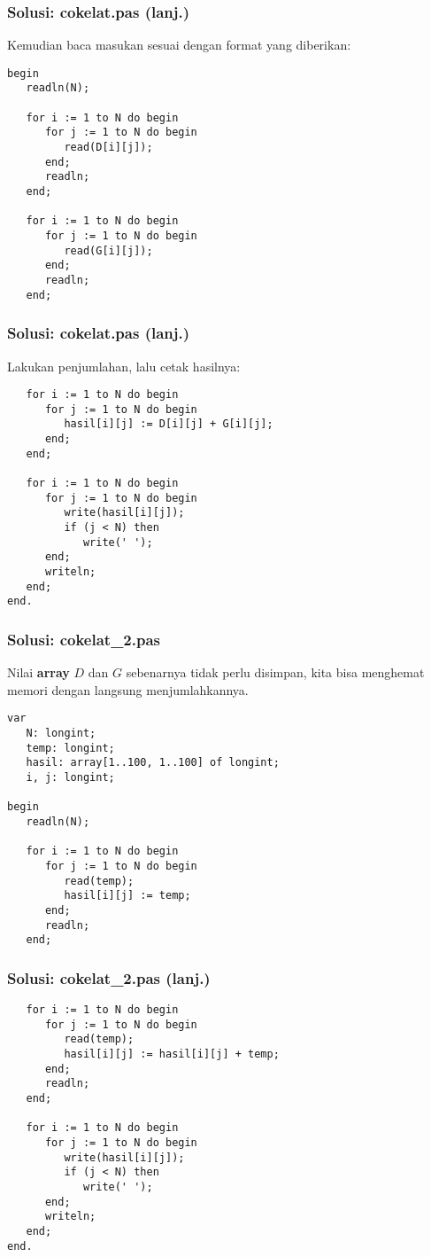 \documentclass{beamer}
\begin{document}
\begin{frame}[fragile]
\frametitle{Solusi: cokelat.pas (lanj.)}
Kemudian baca masukan sesuai dengan format yang diberikan:
\begin{lstlisting}
begin
   readln(N);
   
   for i := 1 to N do begin
      for j := 1 to N do begin
         read(D[i][j]);
      end;
      readln;
   end;

   for i := 1 to N do begin
      for j := 1 to N do begin
         read(G[i][j]);
      end;
      readln;
   end;
\end{lstlisting}
\end{frame}

\begin{frame}[fragile]
\frametitle{Solusi: cokelat.pas (lanj.)}
Lakukan penjumlahan, lalu cetak hasilnya:
\begin{lstlisting}
   for i := 1 to N do begin
      for j := 1 to N do begin
         hasil[i][j] := D[i][j] + G[i][j];
      end;
   end;   

   for i := 1 to N do begin
      for j := 1 to N do begin
         write(hasil[i][j]);
         if (j < N) then 
            write(' ');
      end;
      writeln;
   end;
end.
\end{lstlisting}
\end{frame}

\begin{frame}[fragile]
\frametitle{Solusi: cokelat\_2.pas}
Nilai \textbf{array} $D$ dan $G$ sebenarnya tidak perlu disimpan, kita bisa menghemat memori dengan langsung menjumlahkannya. 
\begin{lstlisting}
var
   N: longint;
   temp: longint;
   hasil: array[1..100, 1..100] of longint;
   i, j: longint;

begin
   readln(N);
   
   for i := 1 to N do begin
      for j := 1 to N do begin
         read(temp);
         hasil[i][j] := temp;
      end;
      readln;
   end;
\end{lstlisting}
\end{frame}

\begin{frame}[fragile]
\frametitle{Solusi: cokelat\_2.pas (lanj.)}
\begin{lstlisting}
   for i := 1 to N do begin
      for j := 1 to N do begin
         read(temp);
         hasil[i][j] := hasil[i][j] + temp;
      end;
      readln;
   end;

   for i := 1 to N do begin
      for j := 1 to N do begin
         write(hasil[i][j]);
         if (j < N) then 
            write(' ');
      end;
      writeln;
   end;
end.
\end{lstlisting}
\end{frame}
\end{document}
